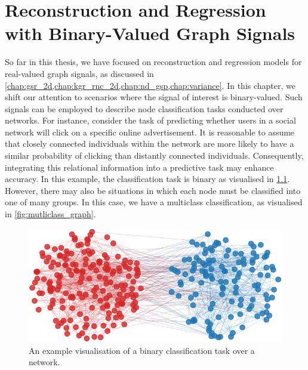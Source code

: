\chapter{Reconstruction and Regression with Binary-Valued Graph Signals} %

\label{chap:binary} 


So far in this thesis, we have focused on reconstruction and regression models for real-valued graph signals, as discussed in \cref{chap:gsr_2d,chap:kgr_rnc_2d,chap:nd_gsp,chap:variance}. In this chapter, we shift our attention to scenarios where the signal of interest is binary-valued. Such signals can be employed to describe node classification tasks conducted over networks. For instance, consider the task of predicting whether users in a social network will click on a specific online advertisement. It is reasonable to assume that closely connected individuals within the network are more likely to have a similar probability of clicking than distantly connected individuals. Consequently, integrating this relational information into a predictive task may enhance accuracy. In this example, the classification task is binary as visualised in \cref{fig:binary_class_graph}. However, there may also be situations in which each node must be classified into one of many groups. In this case, we have a multiclass classification, as visualised in \cref{fig:mutliclass_graph}. \cite{Li2012}


\begin{figure}[t] 
    \begin{center}
        \includegraphics[width=0.8\linewidth]{Figures/2class_graph.pdf}
    \end{center}
   \caption[Visualisation of a binary classification task over a network]{An example visualisation of a binary classification task over a network.} 
    \label{fig:binary_class_graph}
\end{figure} 

